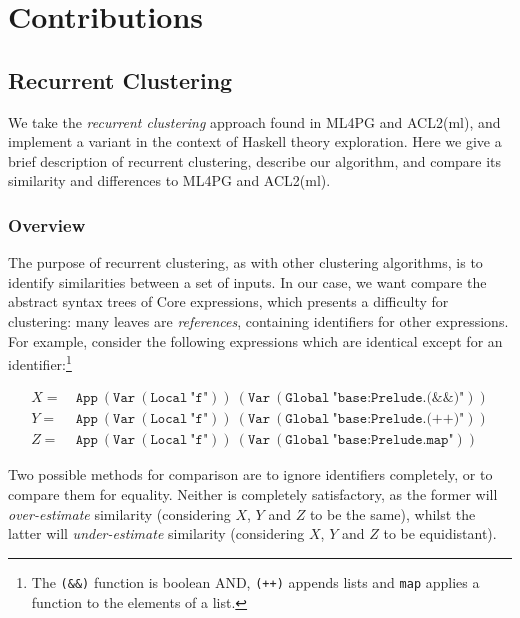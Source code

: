 \section{Contributions}
\label{sec:contributions}

\subsection{Recurrent Clustering}
\label{sec:recurrentclustering}

We take the \emph{recurrent clustering} approach found in ML4PG and ACL2(ml), and implement a variant in the context of Haskell theory exploration. Here we give a brief description of recurrent clustering, describe our algorithm, and compare its similarity and differences to ML4PG and ACL2(ml).

\subsubsection{Overview}

The purpose of recurrent clustering, as with other clustering algorithms, is to identify similarities between a set of inputs. In our case, we want compare the abstract syntax trees of Core expressions, which presents a difficulty for clustering: many leaves are \emph{references}, containing identifiers for other expressions. For example, consider the following expressions which are identical except for an identifier:\footnote{The \texttt{(\&\&)} function is boolean AND, \texttt{(++)} appends lists and \texttt{map} applies a function to the elements of a list.}

\begin{equation*}
  \begin{split}
    X =\ & \texttt{App}\ (\texttt{Var}\ (\texttt{Local}\ \texttt{"f"}))\ (\texttt{Var}\ (\texttt{Global}\ \texttt{"base:Prelude.(\&\&)"})) \\
    Y =\ & \texttt{App}\ (\texttt{Var}\ (\texttt{Local}\ \texttt{"f"}))\ (\texttt{Var}\ (\texttt{Global}\ \texttt{"base:Prelude.(++)"})) \\
    Z =\ & \texttt{App}\ (\texttt{Var}\ (\texttt{Local}\ \texttt{"f"}))\ (\texttt{Var}\ (\texttt{Global}\ \texttt{"base:Prelude.map"}))
  \end{split}
\end{equation*}

Two possible methods for comparison are to ignore identifiers completely, or to compare them for equality. Neither is completely satisfactory, as the former will \emph{over-estimate} similarity (considering $X$, $Y$ and $Z$ to be the same), whilst the latter will \emph{under-estimate} similarity (considering $X$, $Y$ and $Z$ to be equidistant).

